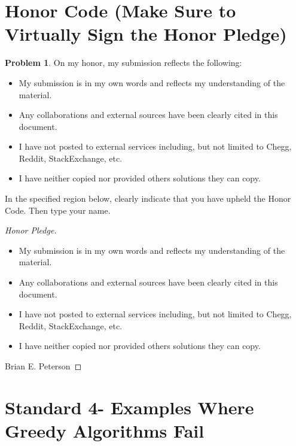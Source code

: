 \documentclass[11pt]{article}
\theoremstyle{definition}
\theoremstyle{definition}
\newtheorem{required}{Problem}
\theoremstyle{definition}
\begin{document}
\section{Honor Code (Make Sure to Virtually Sign the Honor Pledge)} \label{HonorCode}

\begin{required}
On my honor, my submission reflects the following:
\begin{itemize}
\item My submission is in my own words and reflects my understanding of the material.
\item Any collaborations and external sources have been clearly cited in this document.
\item I have not posted to external services including, but not limited to Chegg, Reddit, StackExchange, etc.
\item I have neither copied nor provided others solutions they can copy.
\end{itemize}

\noindent In the specified region below, clearly indicate that you have upheld the Honor Code. Then type your name. 
\end{required}

\begin{proof}[Honor Pledge]
\begin{itemize}
	\item My submission is in my own words and reflects my understanding of the material.
	\item Any collaborations and external sources have been clearly cited in this document.
	\item I have not posted to external services including, but not limited to Chegg, Reddit, StackExchange, etc.
	\item I have neither copied nor provided others solutions they can copy.
\end{itemize}
Brian E. Peterson
\end{proof}


\newpage
\section{Standard 4- Examples Where Greedy Algorithms Fail}
\end{document}
